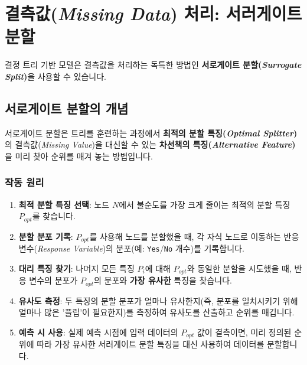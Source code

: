 \documentclass[11pt,a4paper]{book}
\theoremstyle{definition}
\begin{document}
\section{결측값(\emph{Missing Data}) 처리: 서러게이트 분할}

결정 트리 기반 모델은 결측값을 처리하는 독특한 방법인 \textbf{서로게이트 분할(\emph{Surrogate Split})}을 사용할 수 있습니다.

\subsection{서로게이트 분할의 개념}

\begin{tcolorbox}[infobox]
서로게이트 분할은 트리를 훈련하는 과정에서 \textbf{최적의 분할 특징(\emph{Optimal Splitter})}의 결측값(\emph{Missing Value})을 대신할 수 있는 \textbf{차선책의 특징(\emph{Alternative Feature})}을 미리 찾아 순위를 매겨 놓는 방법입니다.
\end{tcolorbox}

\subsubsection*{작동 원리}
\begin{enumerate}
    \item \textbf{최적 분할 특징 선택}: 노드 $N$에서 불순도를 가장 크게 줄이는 최적의 분할 특징 $P_{opt}$를 찾습니다.
    \item \textbf{분할 분포 기록}: $P_{opt}$를 사용해 노드를 분할했을 때, 각 자식 노드로 이동하는 반응 변수(\emph{Response Variable})의 분포(예: \texttt{Yes}/\texttt{No} 개수)를 기록합니다.
    \item \textbf{대리 특징 찾기}: 나머지 모든 특징 $P_i$에 대해 $P_{opt}$와 동일한 분할을 시도했을 때, 반응 변수의 분포가 $P_{opt}$의 분포와 \textbf{가장 유사한} 특징을 찾습니다.
    \item \textbf{유사도 측정}: 두 특징의 분할 분포가 얼마나 유사한지(즉, 분포를 일치시키기 위해 얼마나 많은 '플립'이 필요한지)를 측정하여 유사도를 산출하고 순위를 매깁니다.
    \item \textbf{예측 시 사용}: 실제 예측 시점에 입력 데이터의 $P_{opt}$ 값이 결측이면, 미리 정의된 순위에 따라 가장 유사한 서러게이트 분할 특징을 대신 사용하여 데이터를 분할합니다.
\end{enumerate}
\end{document}
